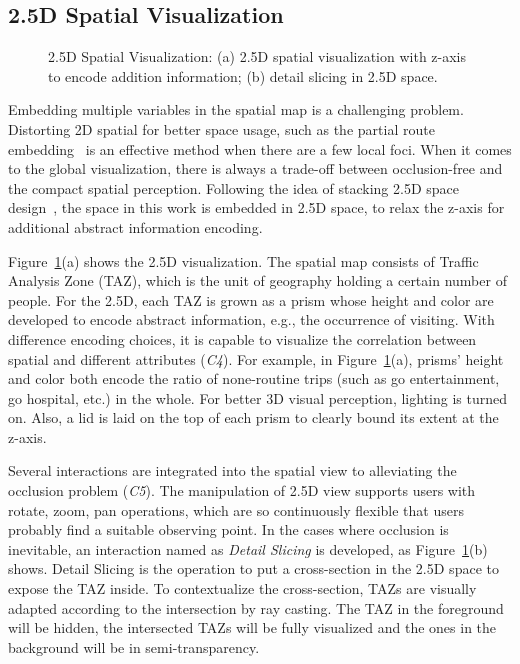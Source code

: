 \subsection{2.5D Spatial Visualization}

\label{subsec:25D}

\begin{figure}[htb!]
\centering
{}\hspace{5pt}
\hspace{5pt}
\caption{2.5D Spatial Visualization: (a) 2.5D spatial visualization with z-axis to encode addition information; (b) detail slicing in 2.5D space.}
\label{fig:2.5D}
\end{figure}


Embedding multiple variables in the spatial map is a challenging problem. Distorting 2D spatial for better space usage, such as the partial route embedding~\citep{sun2016embedding} is an effective method when there are a few local foci. When it comes to the global visualization, there is always a trade-off between occlusion-free and the compact spatial perception. Following the idea of stacking 2.5D space design~\citep{Tominski2012_stacking}, the space in this work is embedded in 2.5D space, to relax the z-axis for additional abstract information encoding.

Figure~\ref{fig:2.5D}(a) shows the 2.5D visualization. The spatial map consists of Traffic Analysis Zone (TAZ), which is the unit of geography holding a certain number of people. For the 2.5D, each TAZ is grown as a prism whose height and color are developed to encode abstract information, e.g., the occurrence of visiting. With difference encoding choices, it is capable to visualize the correlation between spatial and different attributes (\textit{C4}). For example, in Figure~\ref{fig:2.5D}(a), prisms' height and color both encode the ratio of none-routine trips (such as go entertainment, go hospital, etc.) in the whole. For better 3D visual perception, lighting is turned on. Also, a lid is laid on the top of each prism to clearly bound its extent at the z-axis.

Several interactions are integrated into the spatial view to alleviating the occlusion problem (\textit{C5}). The manipulation of 2.5D view supports users with rotate, zoom, pan operations, which are so continuously flexible that users probably find a suitable observing point. In the cases where occlusion is inevitable, an interaction named as \textit{Detail Slicing} is developed, as Figure~\ref{fig:2.5D}(b) shows. Detail Slicing is the operation to put a cross-section in the 2.5D space to expose the TAZ inside. To contextualize the cross-section, TAZs are visually adapted according to the intersection by ray casting. The TAZ in the foreground will be hidden, the intersected TAZs will be fully visualized and the ones in the background will be in semi-transparency.


